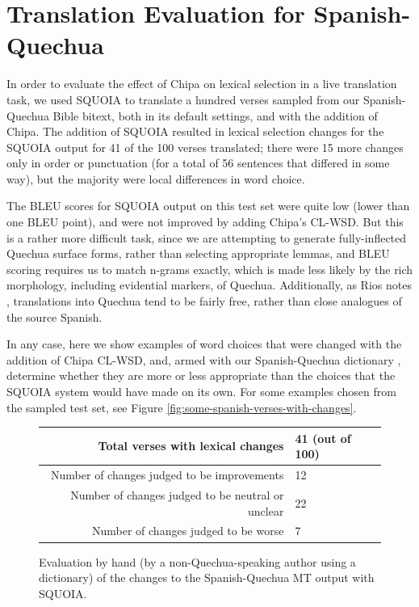 \section{Translation Evaluation for Spanish-Quechua}

In order to evaluate the effect of Chipa on lexical selection in a live
translation task, we used SQUOIA to translate a hundred verses sampled from our
Spanish-Quechua Bible bitext, both in its default settings, and with the
addition of Chipa. The addition of SQUOIA resulted in lexical selection changes
for the SQUOIA output for 41 of the 100 verses translated; there were 15 more
changes only in order or punctuation (for a total of 56 sentences that differed
in some way), but the majority were local differences in word choice.

The BLEU scores for SQUOIA output on this test set were quite low (lower than
one BLEU point), and were not improved by adding Chipa's CL-WSD. But this is a
rather more difficult task, since we are attempting to generate fully-inflected
Quechua surface forms, rather than selecting appropriate lemmas, and BLEU
scoring requires us to match n-grams exactly, which is made less likely by the
rich morphology, including evidential markers, of Quechua. Additionally, as
Rios notes \cite[\S 5.9]{rios2015basic}, translations into Quechua tend to be
fairly free, rather than close analogues of the source Spanish.

In any case, here we show examples of word choices that were changed with the
addition of Chipa CL-WSD, and, armed with our Spanish-Quechua dictionary
\cite{academiamayor}, determine whether they are more or less appropriate than
the choices that the SQUOIA system would have made on its own. For some
examples chosen from the sampled test set, see Figure
\ref{fig:some-spanish-verses-with-changes}.

\begin{figure}
  \begin{centering}
  \begin{tabulary}{\textwidth}{|R|L|}
    \hline
    Total verses with lexical changes & 41 (out of 100) \\
    \hline
    Number of changes judged to be improvements &  12 \\
    \hline
    Number of changes judged to be neutral or unclear &  22 \\
    \hline
    Number of changes judged to be worse &  7 \\
    \hline
  \end{tabulary}
  \end{centering}
  \caption{Evaluation by hand (by a non-Quechua-speaking author using a
  dictionary) of the changes to the Spanish-Quechua MT output with SQUOIA.}
  \label{fig:es-qu-evaluation}
\end{figure}

